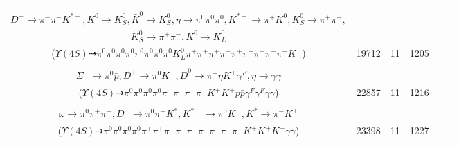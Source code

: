 \documentclass[landscape]{article}
\newcounter{rownumbers}
\newcommand\rn{\stepcounter{rownumbers}\arabic{rownumbers}}
\newcommand{\EOLP}{\\ \hline} %
\newcommand{\topoTags}[1]{#1} %
\begin{document}
\begin{longtable}{clcccc}
\rn & \makecell[l]{ $ 
\Upsilon(4S) \rightarrow B^{0} \bar{B}^{0} ,
B^{0} \rightarrow K^{-} K_{0}^{*+} ,
\bar{B}^{0} \rightarrow \bar{K}^{*} D^{+} D^{-} ,
K_{0}^{*+} \rightarrow \pi^{+} K^{0} ,
\bar{K}^{*} \rightarrow \pi^{0} \bar{K}^{0} ,
D^{+} \rightarrow \pi^{0} \pi^{0} \pi^{0} \pi^{0} \pi^{+} \eta ,
$ \\ $
D^{-} \rightarrow \pi^{-} \pi^{-} K^{*+} ,
K^{0} \rightarrow K_{S}^{0} ,
\bar{K}^{0} \rightarrow K_{S}^{0} ,
\eta \rightarrow \pi^{0} \pi^{0} \pi^{0} ,
K^{*+} \rightarrow \pi^{+} K^{0} ,
K_{S}^{0} \rightarrow \pi^{+} \pi^{-} ,
$ \\ $
K_{S}^{0} \rightarrow \pi^{+} \pi^{-} ,
K^{0} \rightarrow K_{L}^{0} 
$ \\ ($
\Upsilon(4S) \dashrightarrow \pi^{0} \pi^{0} \pi^{0} \pi^{0} \pi^{0} \pi^{0} \pi^{0} \pi^{0} K_{L}^{0} \pi^{+} \pi^{+} \pi^{+} \pi^{+} \pi^{+} \pi^{-} \pi^{-} \pi^{-} \pi^{-} K^{-} 
$) } & \topoTags{19712 & }11 & 1205 \EOLP

\rn & \makecell[l]{ $ 
\Upsilon(4S) \rightarrow B^{0} \bar{B}^{0} ,
B^{0} \rightarrow \rho^{+} D^{*-} \Sigma^{+} \bar{\Sigma}^{-} ,
\bar{B}^{0} \rightarrow \pi^{-} D^{+} ,
\rho^{+} \rightarrow \pi^{0} \pi^{+} \gamma^{F} ,
D^{*-} \rightarrow \pi^{-} \bar{D}^{0} ,
\Sigma^{+} \rightarrow \pi^{0} p ,
$ \\ $
\bar{\Sigma}^{-} \rightarrow \pi^{0} \bar{p} ,
D^{+} \rightarrow \pi^{0} K^{+} ,
\bar{D}^{0} \rightarrow \pi^{-} \eta K^{+} \gamma^{F} ,
\eta \rightarrow \gamma \gamma 
$ \\ ($
\Upsilon(4S) \dashrightarrow \pi^{0} \pi^{0} \pi^{0} \pi^{0} \pi^{+} \pi^{-} \pi^{-} \pi^{-} K^{+} K^{+} p \bar{p} \gamma^{F} \gamma^{F} \gamma \gamma 
$) } & \topoTags{22857 & }11 & 1216 \EOLP

\rn & \makecell[l]{ $ 
\Upsilon(4S) \rightarrow B^{0} \bar{B}^{0} ,
B^{0} \rightarrow \rho^{0} \pi^{+} \eta \omega \omega D^{-} ,
\bar{B}^{0} \rightarrow K^{+} K^{*-} ,
\rho^{0} \rightarrow \pi^{+} \pi^{-} ,
\eta \rightarrow \gamma \gamma ,
\omega \rightarrow \pi^{0} \pi^{+} \pi^{-} ,
$ \\ $
\omega \rightarrow \pi^{0} \pi^{+} \pi^{-} ,
D^{-} \rightarrow \pi^{0} \pi^{-} K^{*} ,
K^{*-} \rightarrow \pi^{0} K^{-} ,
K^{*} \rightarrow \pi^{-} K^{+} 
$ \\ ($
\Upsilon(4S) \dashrightarrow \pi^{0} \pi^{0} \pi^{0} \pi^{0} \pi^{+} \pi^{+} \pi^{+} \pi^{+} \pi^{-} \pi^{-} \pi^{-} \pi^{-} \pi^{-} K^{+} K^{+} K^{-} \gamma \gamma 
$) } & \topoTags{23398 & }11 & 1227 \EOLP


\end{longtable}
\end{document}
